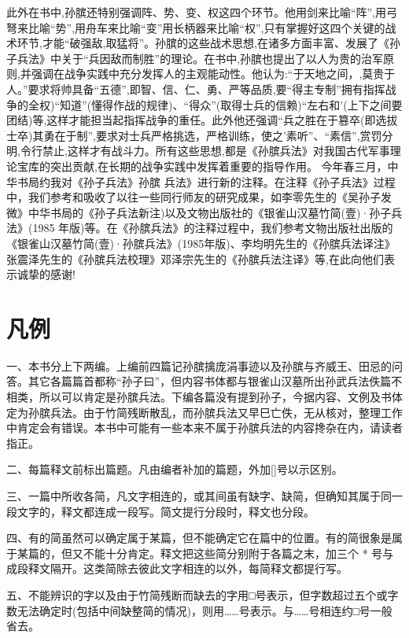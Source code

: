 \documentclass[12pt,UTF8]{ctexbook}
\begin{document}
此外在书中,孙膑还特别强调阵、势、变、权这四个环节。他用剑来比喻“阵”,用弓弩来比喻“势”,用舟车来比喻“变”用长柄器来比喻“权”,只有掌握好这四个关键的战术环节,才能“破强敌,取猛将”。孙膑的这些战术思想,在诸多方面丰富、发展了《孙子兵法》中关于“兵因敌而制胜”的理论。在书中,孙膑也提出了以人为贵的治军原则,并强调在战争实践中充分发挥人的主观能动性。他认为:“于天地之间，,莫贵于人。”要求将帅具备“五德”,即智、信、仁、勇、严等品质,要“得主专制”拥有指挥战争的全权)“知道”(懂得作战的规律)、“得众”(取得士兵的信赖)“左右和’(上下之间要团结)等,这样才能担当起指挥战争的重任。此外他还强调“兵之胜在于篡卒(即选拔士卒)其勇在于制”,要求对士兵严格挑选，严格训练，使之'素听”、“素信”,赏罚分明,令行禁止,这样才有战斗力。所有这些思想,都是《孙膑兵法》对我国古代军事理论宝库的突出贡献,在长期的战争实践中发挥着重要的指导作用。
今年春三月，中华书局约我对《孙子兵法》孙膑
兵法》进行新的注释。在注释《孙子兵法》过程中，我们参考和吸收了以往一些同行师友的研究成果，如李零先生的《吴孙子发微》中华书局的《孙子兵法新注)以及文物出版社的《银雀山汉墓竹简(壹)·孙子兵法》(1985 年版)等。在《孙膑兵法》的注释过程中，我们参考文物出版社出版的《银雀山汉墓竹简(壹)·孙膑兵法》(1985年版)、李均明先生的《孙膑兵法译注》张震泽先生的《孙膑兵法校理》邓泽宗先生的《孙膑兵法注译》等,在此向他们表示诚挚的感谢!

\chapter{凡例}

一、本书分上下两编。上编前四篇记孙膑擒庞涓事迹以及孙膑与齐威王、田忌的问答。其它各篇篇首都称“孙子曰”，但内容书体都与银雀山汉墓所出孙武兵法佚篇不相类，所以可以肯定是孙膑兵法。下编各篇没有提到孙子，今据内容、文例及书体定为孙膑兵法。由于竹简残断散乱，而孙膑兵法又早巳亡佚，无从核对，整理工作中肯定会有错误。本书中可能有一些本来不属于孙膑兵法的内容搀杂在内，请读者指正。

二、每篇释文前标出篇题。凡由编者补加的篇题，外加[]号以示区别。

三、一篇中所收各简，凡文字相连的，或其间虽有缺字、缺简，但确知其属于同一段文字的，释文都连成一段写。简文提行分段时，释文也分段。

四、有的简虽然可以确定属于某篇，但不能确定它在篇中的位置。有的简很象是属于某篇的，但又不能十分肯定。释文把这些简分别附于各篇之末，加三个 * 号与成段释文隔开。这类简除去彼此文字相连的以外，每简释文都提行写。

五、不能辨识的字以及由于竹简残断而缺去的字用□号表示，但字数超过五个或字数无法确定时(包括中间缺整简的情况)，则用……号表示。与……号相连约□号一般省去。
\end{document}
